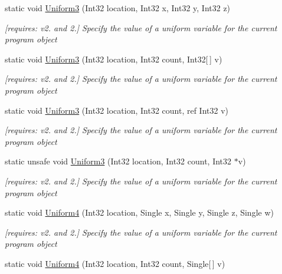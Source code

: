 \begin{DoxyCompactItemize}
static void \hyperlink{class_open_t_k_1_1_graphics_1_1_e_s20_1_1_g_l_a3971e3433af8bfa12e18bf7ae3f4702f}{Uniform3} (Int32 location, Int32 x, Int32 y, Int32 z)
\begin{DoxyCompactList}\small\item\em \mbox{[}requires\-: v2. and 2.\mbox{]} Specify the value of a uniform variable for the current program object \end{DoxyCompactList}\item 
static void \hyperlink{class_open_t_k_1_1_graphics_1_1_e_s20_1_1_g_l_a76f4139995b4eca0d7e09d79d182b6b3}{Uniform3} (Int32 location, Int32 count, Int32\mbox{[}$\,$\mbox{]} v)
\begin{DoxyCompactList}\small\item\em \mbox{[}requires\-: v2. and 2.\mbox{]} Specify the value of a uniform variable for the current program object \end{DoxyCompactList}\item 
static void \hyperlink{class_open_t_k_1_1_graphics_1_1_e_s20_1_1_g_l_aae0b4c0528bc52e684c863bf22a21625}{Uniform3} (Int32 location, Int32 count, ref Int32 v)
\begin{DoxyCompactList}\small\item\em \mbox{[}requires\-: v2. and 2.\mbox{]} Specify the value of a uniform variable for the current program object \end{DoxyCompactList}\item 
static unsafe void \hyperlink{class_open_t_k_1_1_graphics_1_1_e_s20_1_1_g_l_ac1eee5eb7b4eddef14ee684e9f7682d8}{Uniform3} (Int32 location, Int32 count, Int32 $\ast$v)
\begin{DoxyCompactList}\small\item\em \mbox{[}requires\-: v2. and 2.\mbox{]} Specify the value of a uniform variable for the current program object \end{DoxyCompactList}\item 
static void \hyperlink{class_open_t_k_1_1_graphics_1_1_e_s20_1_1_g_l_aee712eaefa4d345b2c5017bee0055a67}{Uniform4} (Int32 location, Single x, Single y, Single z, Single w)
\begin{DoxyCompactList}\small\item\em \mbox{[}requires\-: v2. and 2.\mbox{]} Specify the value of a uniform variable for the current program object \end{DoxyCompactList}\item 
static void \hyperlink{class_open_t_k_1_1_graphics_1_1_e_s20_1_1_g_l_a7f61a29522a33debf8749a97df714f67}{Uniform4} (Int32 location, Int32 count, Single\mbox{[}$\,$\mbox{]} v)

\end{DoxyCompactItemize}
